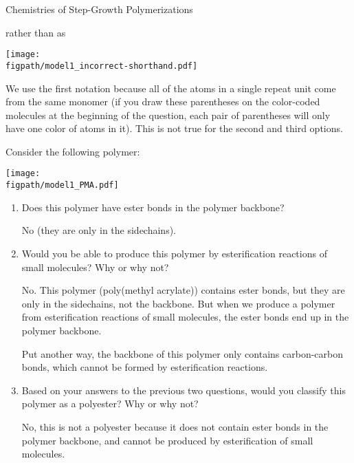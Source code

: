 \begin{activity}{Chemistries of Step-Growth Polymerizations}
\begin{ctqs}
\begin{enumerate}
	rather than as
	
	\centerline{\texttt{[image: \\figpath/model1\_incorrect-shorthand.pdf]}}
			
				\begin{solution}[2in]
					We use the first notation because all of the atoms in a single repeat unit come from the same monomer (if you draw these parentheses on the color-coded molecules at the beginning of the question, each pair of parentheses will only have one color of atoms in it).  This is not true for the second and third options.
				\end{solution}
			
		\end{enumerate}
	
	\question Consider the following polymer:\label{\labelbase:ctq:PMA}
	
	\centerline{\texttt{[image: \\figpath/model1\_PMA.pdf]}}
	
		\begin{enumerate}
				
			\item Does this polymer have ester bonds in the polymer backbone?
			
				\begin{solution}[0.75in]
					No (they are only in the sidechains).
				\end{solution}
		
			\item Would you be able to produce this polymer by esterification reactions of small molecules?  Why or why not?
			
				\begin{solution}[2in]
					No.  This polymer (poly(methyl acrylate)) contains ester bonds, but they are only in the sidechains, not the backbone.  But when we produce a polymer from esterification reactions of small molecules, the ester bonds end up in the polymer backbone.
					
					Put another way, the backbone of this polymer only contains carbon-carbon bonds, which cannot be formed by esterification reactions.
				\end{solution}
			
			\item Based on your answers to the previous two questions, would you classify this polymer as a polyester?  Why or why not?
			
				\begin{solution}[2in]
					No, this is not a polyester because it does not contain ester bonds in the polymer backbone, and cannot be produced by esterification of small molecules.
				\end{solution}
			

\end{enumerate}
\end{ctqs}
\end{activity}
